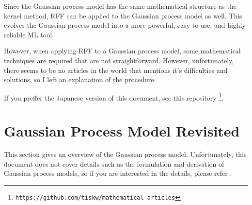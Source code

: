 \documentclass[twocolumn, a4paper, 10pt]{article}
\begin{document}
Since the Gaussian process model has the same mathematical structure as the kernel method,
RFF can be applied to the Gaussian process model as well. This evolves the Gaussian process model
into a more powerful, easy-to-use, and highly reliable ML tool.

However, when applying RFF to a Gaussian process model, some mathematical techniques are required
that are not straightforward. However, unfortunately, there seems to be no articles in the world
that mentions it's difficulties and solutions, so I left an explanation of the procedure.

If you preffer the Japanese version of this document, see this repository
\footnote{\texttt{https://github.com/tiskw/mathematical-articles}}.


\section{Gaussian Process Model Revisited}\titlebar

This section gives an overview of the Gaussian process model. Unfortunately, this document
does not cover details such as the formulation and derivation of Gaussian process models,
so if you are interested in the details, please refer \cite{Rasmussen2006}.
\end{document}
